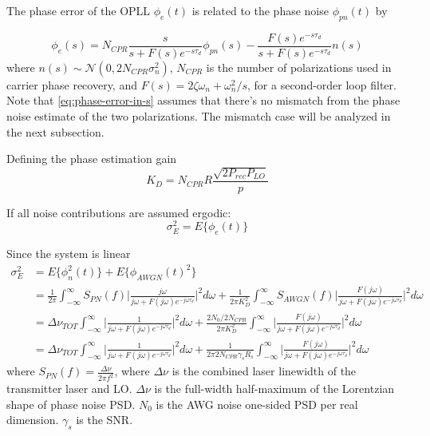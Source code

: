 \documentclass[a4paper]{article}
\begin{document}
The phase error of the OPLL $\phi_e(t)$ is related to the phase noise $\phi_{pn}(t)$ by

\begin{equation} \label{eq:phase-error-in-s}
\phi_e(s) = N_{CPR}\frac{s}{s + F(s)e^{-s\tau_d}}\phi_{pn}(s) - \frac{F(s)e^{-s\tau_d}}{s + F(s)e^{-s\tau_d}}n(s)
\end{equation}
where $n(s) \sim\mathcal{N}(0, 2N_{CPR}\sigma_n^2)$, $N_{CPR}$ is the number of polarizations used in carrier phase recovery, and $F(s) = 2\zeta\omega_n + \omega_n^2/s$, for a second-order loop filter. Note that \eqref{eq:phase-error-in-s} assumes that there's no mismatch from the phase noise estimate of the two polarizations. The mismatch case will be analyzed in the next subsection.

Defining the phase estimation gain
\begin{equation}
K_D = N_{CPR}R\frac{\sqrt{2P_{rec}P_{LO}}}{p}
\end{equation}

If all noise contributions are assumed ergodic:
\begin{equation}
\sigma_E^2 = E\{\phi_e(t)\}
\end{equation}

Since the system is linear
\begin{align} \label{eq:phase_error_variance} \nonumber
\sigma_E^2 &= E\{\phi_n^2(t)\} + E\{\phi_{AWGN}(t)^2\} \\ \nonumber
&= \frac{1}{2\pi}\int_{-\infty}^\infty S_{PN}(f)\bigg|\frac{j\omega}{j\omega + F(j\omega)e^{-j\omega\tau_d}}\bigg|^2d\omega + \frac{1}{2\pi K_D^2}\int_{-\infty}^\infty S_{AWGN}(f)\bigg|\frac{F(j\omega)}{j\omega + F(j\omega)e^{-j\omega\tau_d}}\bigg|^2d\omega \\ \nonumber
&= \Delta\nu_{TOT}\int_{-\infty}^\infty \bigg|\frac{1}{j\omega + F(j\omega)e^{-j\omega\tau_d}}\bigg|^2d\omega + \frac{2N_0/2N_{CPR}}{2\pi K_D^2}\int_{-\infty}^\infty \bigg|\frac{F(j\omega)}{j\omega + F(j\omega)e^{-j\omega\tau_d}}\bigg|^2d\omega \\
&= \Delta\nu_{TOT}\int_{-\infty}^\infty \bigg|\frac{1}{j\omega + F(j\omega)e^{-j\omega\tau_d}}\bigg|^2d\omega + \frac{1}{2\pi 2N_{CPR}\gamma_sR_s}\int_{-\infty}^\infty \bigg|\frac{F(j\omega)}{j\omega + F(j\omega)e^{-j\omega\tau_d}}\bigg|^2d\omega 
\end{align}
where $S_{PN}(f) = \frac{\Delta\nu}{2\pi f^2}$, where $\Delta\nu$ is the combined laser linewidth of the transmitter laser and LO.  $\Delta\nu$ is the full-width half-maximum of the Lorentzian shape of phase noise PSD. $N_0$ is the AWG noise one-sided PSD per real dimension. $\gamma_s$ is the SNR.
\end{document}
